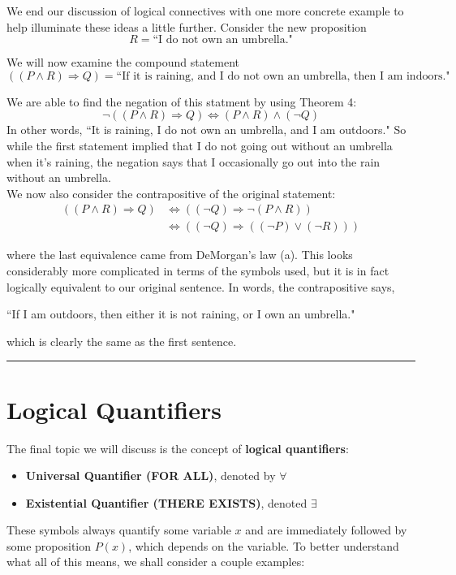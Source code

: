 \documentclass[12pt]{article}
\renewcommand{\_}[1]{\underline{ #1 }}
\theoremstyle{definition}
\numberwithin{equation}{subsection}
\begin{document}
\bigskip

We end our discussion of logical connectives with one more concrete example to help illuminate these ideas a little further. Consider the new proposition
$$ R = \text{``I do not own an umbrella."} $$

We will now examine the compound statement
$$
    ((P \land R) \Longrightarrow Q) = \text{``If it is raining, and I do not own an umbrella, then I am indoors."}
$$

We are able to find the negation of this statment by using Theorem 4:
$$
    \neg ((P \land R) \Longrightarrow Q) \Longleftrightarrow (P \land R) \land (\neg Q)
$$
 In other words, ``It is raining, I do not own an umbrella, and I am outdoors." So while the first statement implied that I do not going out without an umbrella when it's raining, the negation says that I occasionally go out into the rain without an umbrella.\\
 
We now also consider the contrapositive of the original statement:
\begin{align*}
    ((P \land R) \Longrightarrow Q) &\Longleftrightarrow ((\neg Q) \Longrightarrow \neg(P \land R))\\
    &\Longleftrightarrow ((\neg Q) \Longrightarrow ((\neg P) \lor (\neg R)))
\end{align*}

where the last equivalence came from DeMorgan's law (a). This looks considerably more complicated in terms of the symbols used, but it is in fact logically equivalent to our original sentence. In words, the contrapositive says,
\begin{center}
    ``If I am outdoors, then either it is not raining, or I own an umbrella."
\end{center}
which is clearly the same as the first sentence.

\bigskip
\hrule

\section*{Logical Quantifiers}

The final topic we will discuss is the concept of \textbf{logical quantifiers}: 
\begin{itemize}
    \item \textbf{Universal Quantifier (FOR ALL)}, denoted by $\forall$
    \item \textbf{Existential Quantifier (THERE EXISTS)}, denoted $\exists$
\end{itemize}
These symbols always quantify some variable $x$ and are immediately followed by some proposition $P(x)$, which depends on the variable. To better understand what all of this means, we shall consider a couple examples:\\
\end{document}
